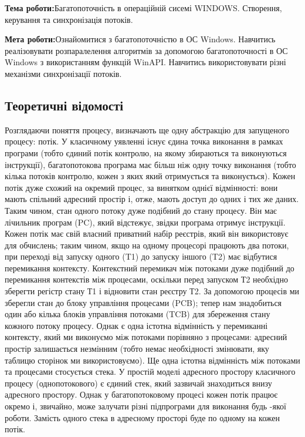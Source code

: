 \documentclass[12pt]{extarticle}
\begin{document}
\textbf{Тема роботи:}Багатопоточність в операційній сисемі WINDOWS. Створення,
керування та синхронізація потоків.
\vspace{12pt}

\textbf{Мета роботи:}Ознайомитися з багатопоточністю в ОС Windows. Навчитись
реалізовувати розпаралелення алгоритмів за допомогою багатопоточності в ОС
Windows з використанням функцій WinAPI. Навчитись використовувати різні
механізми синхронізації потоків.

\subsection*{Теоретичні відомості}
Розглядаючи поняття процесу, визначають ще одну абстракцію для
запущеного процесу: потік. У класичному уявленні існує єдина точка виконання
в рамках програми (тобто єдиний потік контролю, на якому збираються та
виконуються інструкції), багатопотокова програма має більш ніж одну точку
виконання (тобто кілька потоків контролю, кожен з яких який отримується та
виконується).
Кожен потік дуже схожий на окремий процес, за винятком однієї відмінності:
вони мають спільний адресний простір і, отже, мають доступ до одних і тих же
даних. Таким чином, стан одного потоку дуже подібний до стану процесу. Він
має лічильник програм (PC), який відстежує, звідки програма отримує інструкції.
Кожен потік має свій власний приватний набір реєстрів, який він використовує
для обчислень; таким чином, якщо на одному процесорі працюють два потоки,
при переході від запуску одного (T1) до запуску іншого (T2) має відбутися
перемикання контексту. Контекстний перемикач між потоками дуже подібний до
перемикання контекстів між процесами, оскільки перед запуском Т2 необхідно
зберегти регістр стану Т1 і відновити стан реєстру Т2. За допомогою процесів ми
зберегли стан до блоку управління процесами (PCB); тепер нам знадобиться
один або кілька блоків управління потоками (TCB) для збереження стану
кожного потоку процесу. Однак є одна істотна відмінність у перемиканні
контексту, який ми виконуємо між потоками порівняно з процесами: адресний
простір залишається незмінним (тобто немає необхідності змінювати, яку
таблицю сторінок ми використовуємо).
Ще одна істотна відмінність між потоками та процесами стосується стека. У
простій моделі адресного простору класичного процесу (однопотокового) є
єдиний стек, який зазвичай знаходиться внизу адресного простору. Однак у
багатопотоковому процесі кожен потік працює окремо і, звичайно, може
залучати різні підпрограми для виконання будь -якої роботи. Замість одного
стека в адресному просторі буде по одному на кожен потік.
\end{document}
